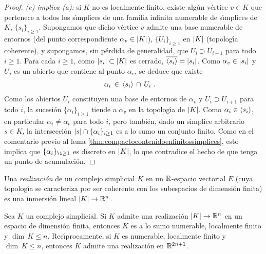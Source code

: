 \begin{proof}
	\emph{(e) implica (a): } si $K$ no es localmente finito, existe
	alg\'{u}n v\'{e}rtice $v\in K$ que pertenece a todos los
	s\'{\i}mplices de una familia infinita numerable de s\'{\i}mplices de
	$K$, $\{s_{i}\}_{i\geq 1}$. Supongamos que dicho v\'{e}rtice $v$
	admite una base numerable de entornos (del punto correspondiente
	$\alpha_{v}\in\left|K\right|$), $\{U_{i}\}_{i\geq 1}$ en $\left|K\right|$
	(topolog\'{\i}a coherente), y supongamos, sin p\'{e}rdida de
	generalidad, que $U_{i}\supset U_{i+1}$ para todo $i\geq 1$.
	Para cada $i\geq 1$, como $\left|s_{i}\right|\subset\left|K\right|$ es cerrado,
	$\overline{\langle s_{i}\rangle}=\left|s_{i}\right|$. Como
	$\alpha_{v}\in\left|s_{i}\right|$ y $U_{j}$ es un abierto que contiene al
	punto $\alpha_{v}$, se deduce que existe
	\begin{align*}
		& \alpha_{i}\,\in\,\langle s_{i}\rangle\,\cap\,U_{i}
		\text{ .}
	\end{align*}
	Como los abiertos $U_{i}$ constituyen una base de entornos de
	$\alpha_{v}$ y $U_{i}\supset U_{i+1}$ para todo $i$, la sucesi\'{o}n
	$\{\alpha_{i}\}_{i\geq 1}$ tiende a $\alpha_{v}$ en la topolog\'{\i}a
	de $\left|K\right|$. Como $\alpha_{i}\in\langle s_{i}\rangle$, en
	particular $\alpha_{i}\not=\alpha_{v}$ para todo $i$, pero
	tambi\'{e}n, dado un s\'{\i}mplice arbitrario $s\in K$, la
	intersecci\'{o}n $\left|s\right|\cap\{\alpha_{i}\}_{i\geq 1}$ es a lo sumo
	un conjunto finito. Como en el comentario previo al lema
	\ref{thm:compactocontenidoenfinitossimplices}, esto implica que
	$\{\alpha_{i}\}_{\i\geq 1}$ es discreto en $\left|K\right|$, lo que
	contradice el hecho de que tenga un punto de acumulaci\'{o}n.
\end{proof}

Una \emph{realizaci\'{o}n} de un complejo simplicial $K$ en un
$\mathbb{R}$-espacio vectorial $E$ (cuya topolog\'{\i}a se caracteriza por
ser coherente con los subespacios de dimensi\'{o}n finita) es una
inmersi\'{o}n lineal $\left|K\right|\rightarrow\mathbb{R}^{n}$.

\begin{teoInmersionDeUnComplejo}\label{thm:inmersiondeuncomplejo}
	Sea $K$ un complejo simplicial. Si $K$ admite una realizaci\'{o}n
	$\left|K\right|\rightarrow\mathbb{R}^{n}$ en un espacio de dimensi\'{o}n
	finita, entonces $K$ es a lo sumo numerable, localmente finito y
	$\dim\,K\leq n$. Rec\'{\i}procamente, si $K$ es numerable, localmente
	finito y $\dim\,K\leq n$, entonces $K$ admite una realizaci\'{o}n
	en $\mathbb{R}^{2n+1}$.
\end{teoInmersionDeUnComplejo}
